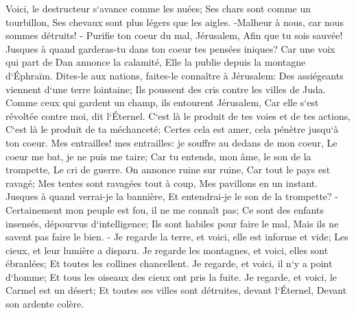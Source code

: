 \verse Voici, le destructeur s`avance comme les nuées; Ses chars sont comme un tourbillon, Ses chevaux sont plus légers que les aigles. -Malheur à nous, car nous sommes détruits! - 
\verse Purifie ton coeur du mal, Jérusalem, Afin que tu sois sauvée! Jusques à quand garderas-tu dans ton coeur tes pensées iniques? 
\verse Car une voix qui part de Dan annonce la calamité, Elle la publie depuis la montagne d`Éphraïm. 
\verse Dites-le aux nations, faites-le connaître à Jérusalem: Des assiégeants viennent d`une terre lointaine; Ils poussent des cris contre les villes de Juda. 
\verse Comme ceux qui gardent un champ, ils entourent Jérusalem, Car elle s`est révoltée contre moi, dit l`Éternel. 
\verse C`est là le produit de tes voies et de tes actions, C`est là le produit de ta méchanceté; Certes cela est amer, cela pénètre jusqu`à ton coeur. 
\verse Mes entrailles! mes entrailles: je souffre au dedans de mon coeur, Le coeur me bat, je ne puis me taire; Car tu entends, mon âme, le son de la trompette, Le cri de guerre. 
\verse On annonce ruine sur ruine, Car tout le pays est ravagé; Mes tentes sont ravagées tout à coup, Mes pavillons en un instant. 
\verse Jusques à quand verrai-je la bannière, Et entendrai-je le son de la trompette? - 
\verse Certainement mon peuple est fou, il ne me connaît pas; Ce sont des enfants insensés, dépourvus d`intelligence; Ils sont habiles pour faire le mal, Mais ils ne savent pas faire le bien. - 
\verse Je regarde la terre, et voici, elle est informe et vide; Les cieux, et leur lumière a disparu. 
\verse Je regarde les montagnes, et voici, elles sont ébranlées; Et toutes les collines chancellent. 
\verse Je regarde, et voici, il n`y a point d`homme; Et tous les oiseaux des cieux ont pris la fuite. 
\verse Je regarde, et voici, le Carmel est un désert; Et toutes ses villes sont détruites, devant l`Éternel, Devant son ardente colère. 
